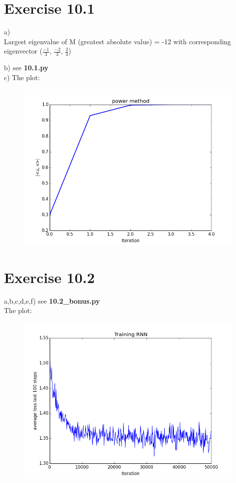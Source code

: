 \documentclass{article}
\begin{document}
\section*{Exercise 10.1}
a)\\
Largest eigenvalue of M (greatest absolute value) = -12 with corresponding eigenvector ($\frac{-1}{3}$, $\frac{-2}{3}$, $\frac{2}{3}$)

b) see \textbf{10.1.py}\\
c) The plot:
\begin{figure}[ht]
\centering
\includegraphics[scale=0.5]{101.png}
\end{figure}

\section*{Exercise 10.2}
a,b,c,d,e,f) see \textbf{10.2\_bonus.py}\\
The plot:
\begin{figure}[ht]
\centering
\includegraphics[scale=0.5]{102.png}
\end{figure}
\end{document}
